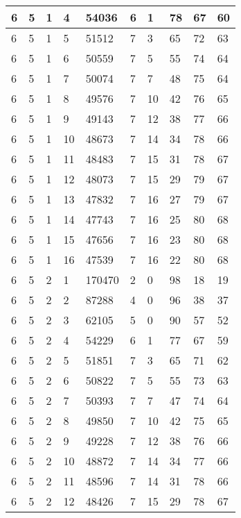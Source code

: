 \begin{table}[!ht]
\begin{tabular}{|l|l|l|l|l|l|l|l|l|l|}
        6 & 5 & 1 & 4 & 54036 & 6 & 1 & 78 & 67 & 60 \\ \hline
        6 & 5 & 1 & 5 & 51512 & 7 & 3 & 65 & 72 & 63 \\ \hline
        6 & 5 & 1 & 6 & 50559 & 7 & 5 & 55 & 74 & 64 \\ \hline
        6 & 5 & 1 & 7 & 50074 & 7 & 7 & 48 & 75 & 64 \\ \hline
        6 & 5 & 1 & 8 & 49576 & 7 & 10 & 42 & 76 & 65 \\ \hline
        6 & 5 & 1 & 9 & 49143 & 7 & 12 & 38 & 77 & 66 \\ \hline
        6 & 5 & 1 & 10 & 48673 & 7 & 14 & 34 & 78 & 66 \\ \hline
        6 & 5 & 1 & 11 & 48483 & 7 & 15 & 31 & 78 & 67 \\ \hline
        6 & 5 & 1 & 12 & 48073 & 7 & 15 & 29 & 79 & 67 \\ \hline
        6 & 5 & 1 & 13 & 47832 & 7 & 16 & 27 & 79 & 67 \\ \hline
        6 & 5 & 1 & 14 & 47743 & 7 & 16 & 25 & 80 & 68 \\ \hline
        6 & 5 & 1 & 15 & 47656 & 7 & 16 & 23 & 80 & 68 \\ \hline
        6 & 5 & 1 & 16 & 47539 & 7 & 16 & 22 & 80 & 68 \\ \hline
        6 & 5 & 2 & 1 & 170470 & 2 & 0 & 98 & 18 & 19 \\ \hline
        6 & 5 & 2 & 2 & 87288 & 4 & 0 & 96 & 38 & 37 \\ \hline
        6 & 5 & 2 & 3 & 62105 & 5 & 0 & 90 & 57 & 52 \\ \hline
        6 & 5 & 2 & 4 & 54229 & 6 & 1 & 77 & 67 & 59 \\ \hline
        6 & 5 & 2 & 5 & 51851 & 7 & 3 & 65 & 71 & 62 \\ \hline
        6 & 5 & 2 & 6 & 50822 & 7 & 5 & 55 & 73 & 63 \\ \hline
        6 & 5 & 2 & 7 & 50393 & 7 & 7 & 47 & 74 & 64 \\ \hline
        6 & 5 & 2 & 8 & 49850 & 7 & 10 & 42 & 75 & 65 \\ \hline
        6 & 5 & 2 & 9 & 49228 & 7 & 12 & 38 & 76 & 66 \\ \hline
        6 & 5 & 2 & 10 & 48872 & 7 & 14 & 34 & 77 & 66 \\ \hline
        6 & 5 & 2 & 11 & 48596 & 7 & 14 & 31 & 78 & 66 \\ \hline
        6 & 5 & 2 & 12 & 48426 & 7 & 15 & 29 & 78 & 67 \\ \hline

\end{tabular}
\end{table}
